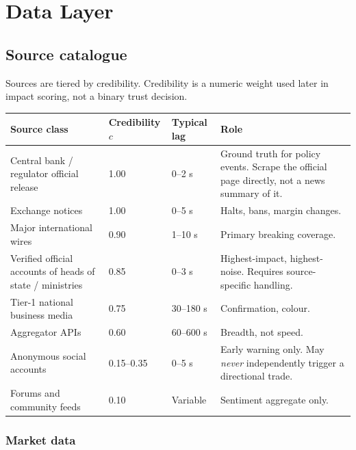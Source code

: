\chapter{Data Layer}

\section{Source catalogue}

Sources are tiered by credibility. Credibility is a numeric weight used later in
impact scoring, not a binary trust decision.

\begin{longtable}{@{}p{4.0cm}p{2.3cm}p{2.3cm}p{5.6cm}@{}}
\toprule
\textbf{Source class} & \textbf{Credibility $c$} & \textbf{Typical lag} &
\textbf{Role}\\
\midrule
Central bank / regulator official release & 1.00 & 0--2 s & Ground truth for
policy events. Scrape the official page directly, not a news summary of it.\\
Exchange notices & 1.00 & 0--5 s & Halts, bans, margin changes.\\
Major international wires & 0.90 & 1--10 s & Primary breaking coverage.\\
Verified official accounts of heads of state / ministries & 0.85 & 0--3 s &
Highest-impact, highest-noise. Requires source-specific handling.\\
Tier-1 national business media & 0.75 & 30--180 s & Confirmation, colour.\\
Aggregator APIs & 0.60 & 60--600 s & Breadth, not speed.\\
Anonymous social accounts & 0.15--0.35 & 0--5 s & Early warning only. May
\emph{never} independently trigger a directional trade.\\
Forums and community feeds & 0.10 & Variable & Sentiment aggregate only.\\
\bottomrule
\end{longtable}

\subsection{Market data}

